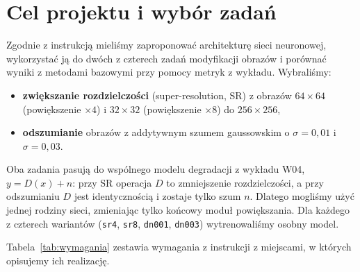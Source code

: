 \documentclass[11pt,a4paper]{article}
\newcommand{\code}[1]{\texttt{\mdseries #1}}
\begin{document}
\tableofcontents
\vspace{0.6cm}

\section{Cel projektu i wybór zadań}

Zgodnie z instrukcją mieliśmy zaproponować architekturę sieci neuronowej, wykorzystać ją do
dwóch z czterech zadań modyfikacji obrazów i porównać wyniki z metodami bazowymi przy pomocy
metryk z wykładu. Wybraliśmy:
\begin{itemize}
  \item \textbf{zwiększanie rozdzielczości} (super-resolution, SR) z obrazów $64\times64$ (powiększenie
        $\times4$) i $32\times32$ (powiększenie $\times8$) do $256\times256$,
  \item \textbf{odszumianie} obrazów z addytywnym szumem gaussowskim o $\sigma=0{,}01$ i $\sigma=0{,}03$.
\end{itemize}

Oba zadania pasują do wspólnego modelu degradacji z wykładu W04, $y = D(x) + n$: przy SR operacja
$D$ to zmniejszenie rozdzielczości, a przy odszumianiu $D$ jest identycznością i zostaje tylko szum $n$.
Dlatego mogliśmy użyć jednej rodziny sieci, zmieniając tylko końcowy moduł powiększania.
Dla każdego z czterech wariantów (\code{sr4}, \code{sr8}, \code{dn001}, \code{dn003}) wytrenowaliśmy
osobny model.

Tabela~\ref{tab:wymagania} zestawia wymagania z instrukcji z miejscami, w których opisujemy ich realizację.
\end{document}
